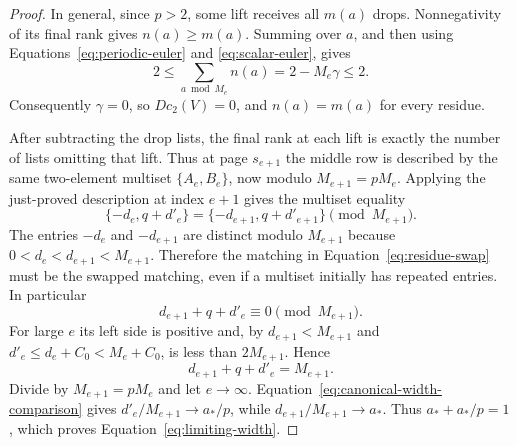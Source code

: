 \begin{proof}
In general, since $p>2$, some lift receives all $m(a)$ drops.
Nonnegativity of its final rank gives $n(a)\geq m(a)$.
Summing over $a$, and then using
Equations~\ref{eq:periodic-euler} and
\ref{eq:scalar-euler}, gives
\[
 2\leq\sum_{a\bmod M_e}n(a)
 =2-M_e\gamma\leq2.
\]
Consequently $\gamma=0$, so $Dc_2(V)=0$, and
$n(a)=m(a)$ for every residue.

After subtracting the drop lists, the final rank at each
lift is exactly the number of lists omitting that lift.
Thus at page $s_{e+1}$ the middle row is described by the
same two-element multiset $\{A_e,B_e\}$, now modulo
$M_{e+1}=pM_e$. Applying the just-proved description at
index $e+1$ gives the multiset equality
\begin{equation}\label{eq:residue-swap}
 \{-d_e,q+d'_e\}
 =\{-d_{e+1},q+d'_{e+1}\}\pmod{M_{e+1}}.
\end{equation}
The entries $-d_e$ and $-d_{e+1}$ are distinct modulo
$M_{e+1}$ because $0<d_e<d_{e+1}<M_{e+1}$.
Therefore the matching in Equation~\ref{eq:residue-swap}
must be the swapped matching, even if a multiset initially
has repeated entries. In particular
\[
 d_{e+1}+q+d'_e\equiv0\pmod{M_{e+1}}.
\]
For large $e$ its left side is positive and, by
$d_{e+1}<M_{e+1}$ and
$d'_e\leq d_e+C_0<M_e+C_0$, is less than
$2M_{e+1}$. Hence
\begin{equation}\label{eq:width-swap-equality}
 d_{e+1}+q+d'_e=M_{e+1}.
\end{equation}
Divide by $M_{e+1}=pM_e$ and let $e\to\infty$.
Equation~\ref{eq:canonical-width-comparison} gives
$d'_e/M_{e+1}\to a_*/p$, while
$d_{e+1}/M_{e+1}\to a_*$. Thus
$a_*+a_*/p=1$, which proves
Equation~\ref{eq:limiting-width}.
\end{proof}
